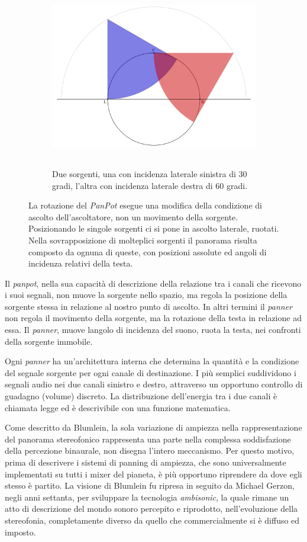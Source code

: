 \begin{figure}[t!]
\begin{subfigure}[t]{0.9\textwidth}
        \includegraphics[height=8cm]{CAPITOLI/_TIKZ/PANNING/pan-both}
        \caption{Due sorgenti, una con incidenza laterale sinistra di 30 gradi,
        l'altra con incidenza laterale destra di 60 gradi.}
        \label{pan:both}
    \end{subfigure}
    \caption{La rotazione del \emph{PanPot} esegue una modifica della condizione
    di ascolto dell'ascoltatore, non un movimento della sorgente. Posizionando
    le singole sorgenti ci si pone in ascolto laterale, ruotati. Nella
    sovrapposizione di molteplici sorgenti il panorama risulta composto da
    ognuna di queste, con posizioni assolute ed angoli di incidenza relativi
    della testa.}
    \label{pan:all}
\end{figure}

Il \emph{panpot}, nella sua capacità di descrizione della relazione tra i canali
che ricevono i suoi segnali, non muove la sorgente nello spazio, ma regola la
posizione della sorgente stessa in relazione al nostro punto di ascolto. In
altri termini il \emph{panner} non regola il movimento della sorgente, ma la
rotazione della testa in relazione ad essa. Il \emph{panner}, muove langolo di
incidenza del suono, ruota la testa, nei confronti della sorgente immobile.

Ogni \emph{panner} ha un'architettura interna che determina la quantità e la
condizione del segnale sorgente per ogni canale di destinazione. I più semplici
suddividono i segnali audio nei due canali sinistro e destro, attraverso un
opportuno controllo di guadagno (volume) discreto. La distribuzione dell'energia
tra i due canali è chiamata legge ed è descrivibile con una funzione matematica.

Come descritto da Blumlein, la sola variazione di ampiezza nella
rappresentazione del panorama stereofonico rappresenta una parte nella complessa
soddisfazione della percezione binaurale, non disegna l'intero meccanismo.
Per questo motivo, prima di descrivere i sistemi di panning di ampiezza, che
sono universalmente implementati su tutti i mixer del pianeta, è più opportuno
riprendere da dove egli stesso è partito. La visione di Blumlein fu ripresa in
seguito da Michael Gerzon, negli anni settanta, per sviluppare la tecnologia
\emph{ambisonic}, la quale rimane un atto di descrizione del mondo sonoro
percepito e riprodotto, nell'evoluzione della stereofonia, completamente diverso
da quello che commercialmente si è diffuso ed imposto.

